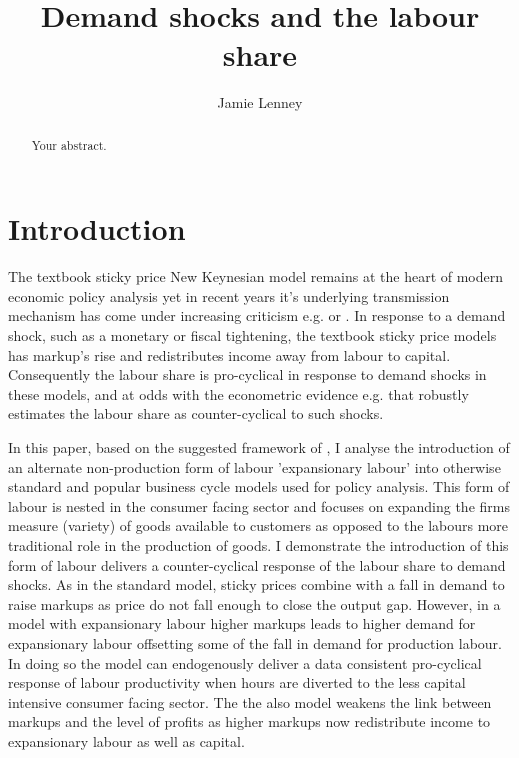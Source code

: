 \documentclass[12pt]{article}
\title{Demand shocks and the labour share}
\author{Jamie Lenney}
\begin{document}
\maketitle

\begin{abstract}
Your abstract.
\end{abstract}

\section{Introduction}

The textbook sticky price New Keynesian model remains at the heart of modern economic policy analysis yet in recent years it's underlying transmission mechanism  has come under increasing criticism e.g. \cite{nekarda2020cyclical} or \cite{broer2020new}. In response to a demand shock, such as a monetary or fiscal tightening, the textbook sticky price models has markup's rise and redistributes income away from labour to capital. Consequently the labour share is pro-cyclical in response to demand shocks in these models, and at odds with the econometric evidence e.g. \cite{cantore2021missing} that robustly estimates the labour share as counter-cyclical to such shocks.

In this paper, based on the suggested framework of \cite{kaplan2020markups}, I analyse the introduction of an alternate non-production form of labour 'expansionary labour' into otherwise standard and popular business cycle models used for policy analysis. This form of labour is nested in the consumer facing sector and focuses on expanding the firms measure (variety) of goods available to customers as opposed to the labours more traditional role in the production of goods. I demonstrate the introduction of this form of labour delivers a counter-cyclical response of the labour share to demand shocks. As in the standard model, sticky prices combine with a fall in demand to raise markups as price do not fall enough to close the output gap. However, in a model with expansionary labour higher markups leads to higher demand for expansionary labour offsetting some of the fall in demand for production labour. In doing so the model can endogenously deliver a data consistent pro-cyclical response of labour productivity when hours are diverted to the less capital intensive consumer facing sector. The the also model weakens the link between markups and the level of profits as higher markups now redistribute income to expansionary labour as well as  capital.      
\end{document}
